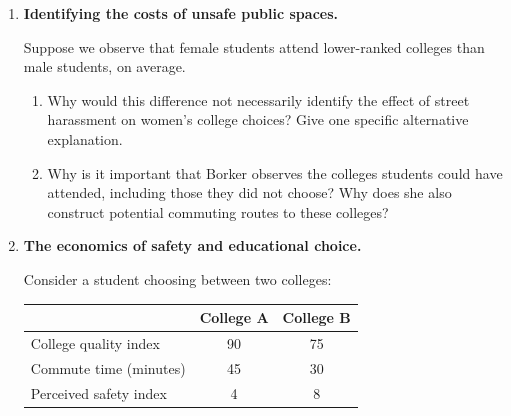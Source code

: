 \documentclass[12pt]{article}
\begin{document}
\begin{enumerate}

\item \textbf{Identifying the costs of unsafe public spaces.}

Suppose we observe that female students attend lower-ranked
colleges than male students, on average.

\begin{enumerate}

\item Why would this difference not necessarily identify
the effect of street harassment on women's college choices?
Give one specific alternative explanation.

\vspace{4cm}

\item Why is it important that Borker observes the colleges
students could have attended, including those they did
not choose? Why does she also construct potential
commuting routes to these colleges?

\vspace{4cm}

\end{enumerate}

\vspace{1cm}

\item \textbf{The economics of safety and educational choice.}

Consider a student choosing between two colleges:

\begin{center}
\begin{tabular}{lcc}
\toprule
& College A & College B \\
\midrule
College quality index & 90 & 75 \\
Commute time (minutes) & 45 & 30 \\
Perceived safety index & 4 & 8 \\
\bottomrule
\end{tabular}
\end{center}


\end{enumerate}
\end{document}
